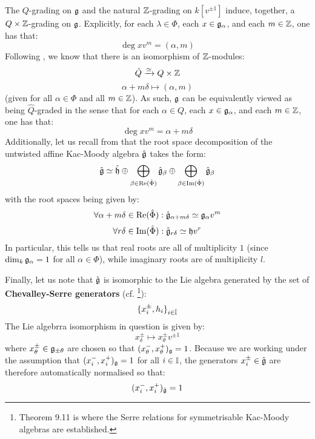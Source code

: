         The $Q$-grading on $\mathfrak{g}$ and the natural $\mathbb{Z}$-grading on $k[v^{\pm 1}]$ induce, together, a $Q \x \Z$-grading on $\mathfrak{g}$. Explicitly, for each $\lambda \in \Phi$, each $x \in \mathfrak{g}_{\alpha}$, and each $m \in \mathbb{Z}$, one has that:
            $$\deg x v^m = (\alpha, m)$$
        Following \cite[Chapter 6]{kac_infinite_dimensional_lie_algebras}, we know that there is an isomorphism of $\mathbb{Z}$-modules:
            $$\hat{Q} \xrightarrow[]{\cong} Q \x \Z$$
            $$\alpha + m\delta \mapsto (\alpha, m)$$
        (given for all $\alpha \in \Phi$ and all $m \in \mathbb{Z}$). As such, $\mathfrak{g}$ can be equivalently viewed as being $\hat{Q}$-graded in the sense that for each $\alpha \in Q$, each $x \in \mathfrak{g}_{\alpha}$, and each $m \in \mathbb{Z}$, one has that:
            $$\deg x v^m = \alpha + m\delta$$
        Additionally, let us recall from \cite[Chapter 7]{kac_infinite_dimensional_lie_algebras} that the root space decomposition of the untwisted affine Kac-Moody algebra $\hat{\mathfrak{g}}$ takes the form:
            $$\hat{\mathfrak{g}} \simeq \hat{\mathfrak{h}} \oplus \bigoplus_{\beta \in \operatorname{Re}(\hat{\Phi})} \hat{\mathfrak{g}}_{\beta} \oplus \bigoplus_{\beta \in \operatorname{Im}(\hat{\Phi})} \hat{\mathfrak{g}}_{\beta}$$
        with the root spaces being given by:
            $$\forall \alpha + m\delta \in \operatorname{Re}(\hat{\Phi}): \hat{\mathfrak{g}}_{\alpha + m\delta} \simeq \mathfrak{g}_{\alpha} v^m$$
            $$\forall r\delta \in \operatorname{Im}(\hat{\Phi}): \hat{\mathfrak{g}}_{r\delta} \simeq \mathfrak{h} v^r$$
        In particular, this tells us that real roots are all of multiplicity $1$ (since $\dim_k \mathfrak{g}_{\alpha} = 1$ for all $\alpha \in \Phi$), while imaginary roots are of multiplicity $l$.
            
        Finally, let us note that $\hat{\mathfrak{g}}$ is isomorphic to the Lie algebra generated by the set of \textbf{Chevalley-Serre generators} (cf. \cite[Theorems 1.2, 1.4, and 9.11]{kac_infinite_dimensional_lie_algebras}\footnote{Theorem 9.11 is where the Serre relations for symmetrisable Kac-Moody algebras are established.}):
            $$\{x_i^{\pm}, h_i\}_{i \in \hat{\mathbb{I}}}$$
        The Lie algebrra isomorphism in question is given by:
            $$x_{\delta}^{\pm} \mapsto x_{\theta}^{\pm} v^{\pm 1}$$
        where $x_{\theta}^{\pm} \in \mathfrak{g}_{\pm \theta}$ are chosen so that $(x_{\theta}^-, x_{\theta}^+)_{\mathfrak{g}} = 1$. Because we are working under the assumption that $(x_i^-, x_i^+)_{\mathfrak{g}} = 1$ for all $i \in \mathbb{I}$, the generators $x_i^{\pm} \in \hat{\mathfrak{g}}$ are therefore automatically normalised so that:
            $$(x_i^-, x_i^+)_{\hat{\mathfrak{g}}} = 1$$